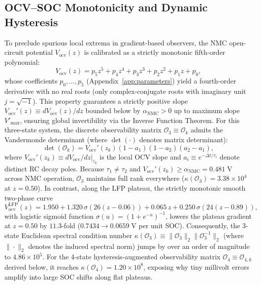 \documentclass[10pt,a4paper]{article}
\begin{document}
\subsection{OCV--SOC Monotonicity and Dynamic Hysteresis}
To preclude spurious local extrema in gradient-based observers, the NMC open-circuit potential $V_{\text{ocv}}(z)$ is calibrated as a strictly monotonic fifth-order polynomial:
\begin{equation}\label{eqn:ocv_poly}
V_{\text{ocv}}(z) = p_5 z^5 + p_4 z^4 + p_3 z^3 + p_2 z^2 + p_1 z + p_0,
\end{equation}
whose coefficients $p_0,\dots,p_5$ (Appendix~\ref{app:parameters}) yield a fourth-order derivative with no real roots (only complex-conjugate roots with imaginary unit $j = \sqrt{-1}$). This property guarantees a strictly positive slope $V_{\text{ocv}}'(z) \equiv dV_{\text{ocv}}(z)/dz$ bounded below by $\alpha_{\text{NMC}} > 0$ up to maximum slope $V'_{\max}$, ensuring global invertibility via the Inverse Function Theorem. For this three-state system, the discrete observability matrix $\mathcal{O}_3 \equiv \mathcal{O}_k$ admits the Vandermonde determinant (where $\det(\cdot)$ denotes matrix determinant):
\begin{equation}\label{eqn:det_obs}
\det(\mathcal{O}_k) = V_{\text{ocv}}'(z_k) (1 - a_1)(1 - a_2)(a_2 - a_1),
\end{equation}
where $V_{\text{ocv}}'(z_k) \equiv dV_{\text{ocv}}/dz|_{z_k}$ is the local OCV slope and $a_i \equiv e^{-\Delta t/\tau_i}$ denote distinct RC decay poles. Because $\tau_1 \ne \tau_2$ and $V_{\text{ocv}}'(z_k) \ge \alpha_{\text{NMC}} = 0.481\;\mathrm{V}$ across NMC operation, $\mathcal{O}_3$ maintains full rank everywhere ($\kappa(\mathcal{O}_3) = 3.38 \times 10^4$ at $z=0.50$). In contrast, along the LFP plateau, the strictly monotonic smooth two-phase curve
\begin{equation}\label{eqn:ocv_lfp}
V_{\text{ocv}}^{\text{LFP}}(z) = 1.950 + 1.320\,\sigma(26(z - 0.06)) + 0.065\,z + 0.250\,\sigma(24(z - 0.89)),
\end{equation}
with logistic sigmoid function $\sigma(u) = (1 + e^{-u})^{-1}$, lowers the plateau gradient at $z=0.50$ by $11.3$-fold ($0.7434 \rightarrow 0.0659\;\mathrm{V}$ per unit SOC). Consequently, the 3-state Euclidean spectral condition number $\kappa(\mathcal{O}_3) \equiv \|\mathcal{O}_3\|_2 \|\mathcal{O}_3^{-1}\|_2$ (where $\|\cdot\|_2$ denotes the induced spectral norm) jumps by over an order of magnitude to $4.86 \times 10^5$. For the 4-state hysteresis-augmented observability matrix $\mathcal{O}_4 \equiv \mathcal{O}_{4,k}$ derived below, it reaches $\kappa(\mathcal{O}_4) = 1.20 \times 10^8$, exposing why tiny millivolt errors amplify into large SOC shifts along flat plateaus.
\end{document}
